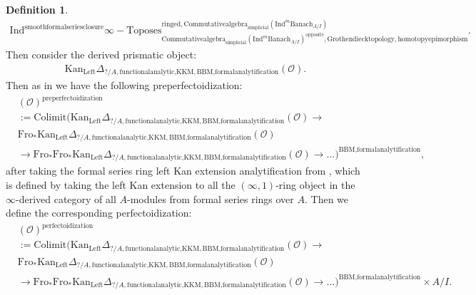 \documentclass[11pt]{book}
\theoremstyle{definition}
\newtheorem{definition}[theorem]{Definition}
\numberwithin{equation}{section}
\begin{document}
\begin{definition}
\begin{align}
\mathrm{Ind}^\text{smoothformalseriesclosure}\infty-\mathrm{Toposes}^{\mathrm{ringed},\mathrm{Commutativealgebra}_{\mathrm{simplicial}}(\mathrm{Ind}^m\mathrm{Banach}_{A/I})}_{\mathrm{Commutativealgebra}_{\mathrm{simplicial}}(\mathrm{Ind}^m\mathrm{Banach}_{A/I})^\mathrm{opposite},\mathrm{Grothendiecktopology,homotopyepimorphism}}. 
\end{align}
Then consider the derived prismatic object:
\begin{align}
\mathrm{Kan}_{\mathrm{Left}}\Delta_{?/A,\text{functionalanalytic,KKM},\text{BBM,formalanalytification}}(\mathcal{O}).
\end{align}	
Then as in \cite[Definition 8.2]{12BS} we have the following preperfectoidization:
\begin{align}
&(\mathcal{O})^{\text{preperfectoidization}}\\
&:=\mathrm{Colimit}(\mathrm{Kan}_{\mathrm{Left}}\Delta_{?/A,\text{functionalanalytic,KKM},\text{BBM,formalanalytification}}(\mathcal{O})\rightarrow \\
&\mathrm{Fro}_*\mathrm{Kan}_{\mathrm{Left}}\Delta_{?/A,\text{functionalanalytic,KKM},\text{BBM,formalanalytification}}(\mathcal{O})\\
&\rightarrow \mathrm{Fro}_* \mathrm{Fro}_*\mathrm{Kan}_{\mathrm{Left}}\Delta_{?/A,\text{functionalanalytic,KKM},\text{BBM,formalanalytification}}(\mathcal{O})\rightarrow...)^{\text{BBM,formalanalytification}},	
\end{align}
after taking the formal series ring left Kan extension analytification from \cite[Section 4.2]{BBM}, which is defined by taking the left Kan extension to all the $(\infty,1)$-ring object in the $\infty$-derived category of all $A$-modules from formal series rings over $A$. Then we define the corresponding perfectoidization:
\begin{align}
&(\mathcal{O})^{\text{perfectoidization}}\\
&:=\mathrm{Colimit}(\mathrm{Kan}_{\mathrm{Left}}\Delta_{?/A,\text{functionalanalytic,KKM},\text{BBM,formalanalytification}}(\mathcal{O})\longrightarrow \\
&\mathrm{Fro}_*\mathrm{Kan}_{\mathrm{Left}}\Delta_{?/A,\text{functionalanalytic,KKM},\text{BBM,formalanalytification}}(\mathcal{O})\\
&\longrightarrow \mathrm{Fro}_* \mathrm{Fro}_*\mathrm{Kan}_{\mathrm{Left}}\Delta_{?/A,\text{functionalanalytic,KKM},\text{BBM,formalanalytification}}(\mathcal{O})\longrightarrow...)^{\text{BBM,formalanalytification}}\times A/I.	
\end{align}

\end{definition}
\end{document}
